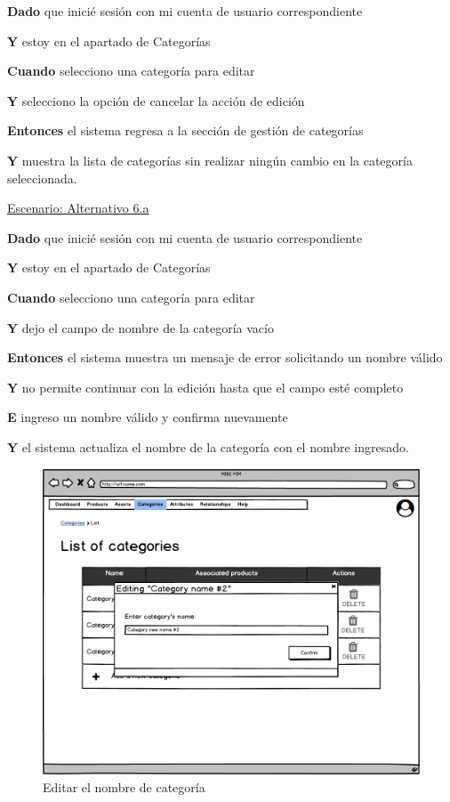 \textbf{Dado} que inicié sesión con mi cuenta de usuario correspondiente\par
\textbf{Y} estoy en el apartado de Categorías\par
\textbf{Cuando} selecciono una categoría para editar\par
\textbf{Y} selecciono la opción de cancelar la acción de edición\par
\textbf{Entonces} el sistema regresa a la sección de gestión de categorías\par
\textbf{Y} muestra la lista de categorías sin realizar ningún cambio en la categoría seleccionada.\par

\underline{Escenario: Alternativo 6.a}\par
\vspace{0.15cm}

\textbf{Dado} que inicié sesión con mi cuenta de usuario correspondiente\par
\textbf{Y} estoy en el apartado de Categorías\par
\textbf{Cuando} selecciono una categoría para editar\par
\textbf{Y} dejo el campo de nombre de la categoría vacío\par
\textbf{Entonces} el sistema muestra un mensaje de error solicitando un nombre válido\par
\textbf{Y} no permite continuar con la edición hasta que el campo esté completo\par
\textbf{E} ingreso un nombre válido y confirma nuevamente\par
\textbf{Y} el sistema actualiza el nombre de la categoría con el nombre ingresado.\par



\vspace{0.20cm}

\begin{figure}[H]
    \includegraphics[width=1\linewidth]{mockups/RF4.3_1.png}
    \caption{Editar el nombre de categoría}
   \end{figure}
\vspace{1.0cm}

